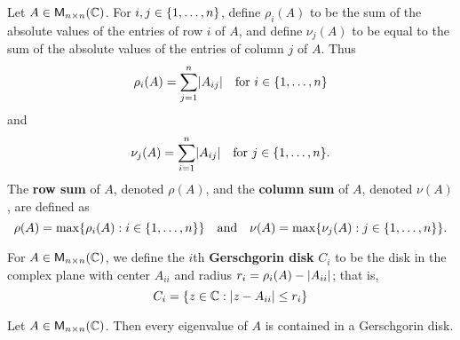 \begin{defn}\label{5.3.8}
  Let \(A \in \mathsf{M}_{{n} \times n}({\mathbb{C}})\).
  For \(i, j \in \left\lbrace1, \dots, n\right\rbrace\), define \(\rho_i(A)\) to be the sum of the absolute values of the entries of row \(i\) of \(A\), and define \(\nu_j(A)\) to be equal to the sum of the absolute values of the entries of column \(j\) of \(A\).
  Thus
  \[
    \rho_i(A) = \sum_{j = 1}^n \abs{A_{i j}} \quad \text{for } i \in \set{1, \dots, n}
  \]
  and
  \[
    \nu_j(A) = \sum_{i = 1}^n \abs{A_{i j}} \quad \text{for } j \in \set{1, \dots, n}.
  \]
  The \textbf{row sum} of \(A\), denoted \(\rho(A)\), and the \textbf{column sum} of \(A\), denoted \(\nu(A)\), are defined as
  \[
    \rho(A) = \max\set{\rho_i(A) : i \in \set{1, \dots, n}} \quad \text{and} \quad \nu(A) = \max\set{\nu_j(A) : j \in \set{1, \dots, n}}.
  \]
\end{defn}

\begin{defn}\label{5.3.9}
  For \(A \in \mathsf{M}_{{n} \times n}({\mathbb{C}})\), we define the \(i\)th \textbf{Gerschgorin disk} \(C_i\) to be the disk in the complex plane with center \(A_{i i}\) and radius \(r_i = \rho_i(A) - \left\lvert A_{i i}\right\rvert\);
  that is,
  \[
    C_i = \left\lbrace z \in \mathbb{C} : \left\lvert z - A_{i i}\right\rvert \leq r_i\right\rbrace
  \]
\end{defn}

\begin{thm}\label{5.16}
  Let \(A \in \mathsf{M}_{{n} \times n}({\mathbb{C}})\).
  Then every eigenvalue of \(A\) is contained in a Gerschgorin disk.
\end{thm}

